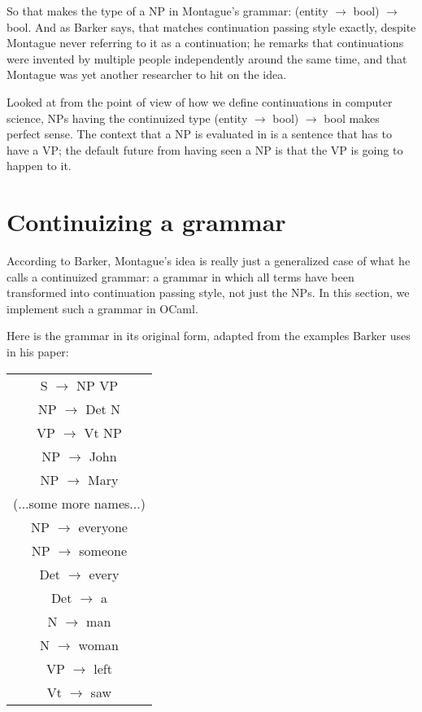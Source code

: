 \documentclass[11pt]{article} %
\begin{document}
So that makes the type of a NP in Montague's grammar: (entity $\rightarrow$ bool) $\rightarrow$ bool. And as Barker says, that matches continuation passing style exactly, despite Montague never referring to it as a continuation; he remarks that continuations were invented by multiple people independently around the same time, and that Montague was yet another researcher to hit on the idea.

Looked at from the point of view of how we define continuations in computer science, NPs having the continuized type (entity $\rightarrow$ bool) $\rightarrow$ bool makes perfect sense. The context that a NP is evaluated in is a sentence that has to have a VP; the default future from having seen a NP is that the VP is going to happen to it.

\section{Continuizing a grammar}

According to Barker, Montague's idea is really just a generalized case of what he calls a continuized grammar: a grammar in which all terms have been transformed into continuation passing style, not just the NPs. In this section, we implement such a grammar in OCaml.

Here is the grammar in its original form, adapted from the examples Barker uses in his paper:
\bigskip

\begin{tabular}{|c|}
\hline 
S $\rightarrow$ NP VP \\
NP $\rightarrow$ Det N \\
VP $\rightarrow$ Vt NP \\
NP $\rightarrow$ John \\
NP $\rightarrow$ Mary \\
(...some more names...) \\
NP $\rightarrow$ everyone \\
NP $\rightarrow$ someone \\
Det $\rightarrow$ every \\
Det $\rightarrow$ a \\
N $\rightarrow$ man \\
N $\rightarrow$ woman\\
VP $\rightarrow$ left \\
Vt $\rightarrow$ saw \\
\hline
\end{tabular}
\bigskip
\end{document}
